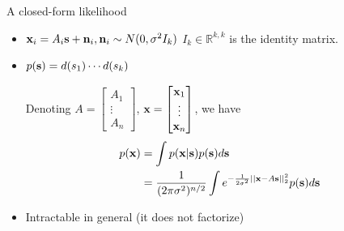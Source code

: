 \documentclass[bigger]{beamer}
\begin{document}
\label{sec:org55f3e63}
\begin{frame}[label={sec:org1ce1417}]{A closed-form likelihood}
\begin{example}
\begin{itemize}
\item $\mathbf{x}_i = A_i \mathbf{s} + \mathbf{n}_i, \mathbf{n}_i \sim N(0, \sigma^2 I_{k})$
  $I_{k} \in \mathbb{R}^{k, k}$ is the identity matrix.
\item \(p(\mathbf{s}) = d(s_1) \cdots d(s_k)\)
  
Denoting $A = \begin{bmatrix} A_1 \\ \vdots \\ A_n \end{bmatrix}$, $\mathbf{x} = \begin{bmatrix}
  \mathbf{x}_1 \\ \vdots \\ \mathbf{x}_n \end{bmatrix}$, we have
\begin{align} p(\mathbf{x}) &= \int p(\mathbf{x}|\mathbf{s})p(\mathbf{s})d\mathbf{s} \\
                                &= \frac{1}{(2\pi \sigma^2)^{n/2}}\int e^{-\frac{1}{2 \sigma^2}||\mathbf{x} - A \mathbf{s}||^2_2}p(\mathbf{s})d\mathbf{s}
                                  \end{align}
\item Intractable in general (it does not factorize)
\end{itemize}
\end{example}
\end{frame}
\end{document}

